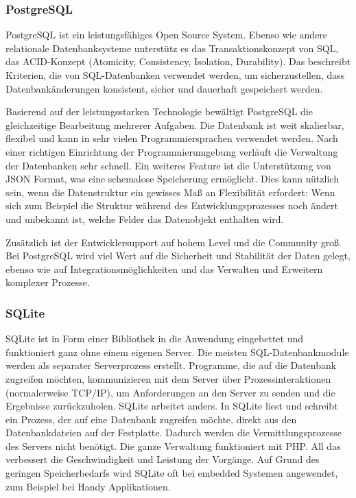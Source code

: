 \subsubsection{PostgreSQL \cite{PostgreSQLAnwendungsfall}}
PostgreSQL ist ein leistungsfähiges Open Source System. Ebenso wie andere relationale Datenbanksysteme unterstütz es das Transaktionskonzept von SQL, das ACID-Konzept (Atomicity, Consistency, Isolation, Durability). Das beschreibt Kriterien, die von SQL-Datenbanken verwendet werden, um sicherzustellen, dass Datenbankänderungen konsistent, sicher und dauerhaft gespeichert werden.

Basierend auf der leistungsstarken Technologie bewältigt PostgreSQL die gleichzeitige Bearbeitung mehrerer Aufgaben. Die Datenbank ist weit skalierbar, flexibel und kann in sehr vielen Programmiersprachen verwendet werden. Nach einer richtigen Einrichtung der Programmierumgebung verläuft die Verwaltung der Datenbanken sehr schnell. Ein weiteres Feature ist die Unterstützung von JSON Format, was eine schemalose Speicherung ermöglicht. Dies kann nützlich sein, wenn die Datenstruktur ein gewisses Maß an Flexibilität erfordert: Wenn sich zum Beispiel die Struktur während des Entwicklungsprozesses noch ändert und unbekannt ist, welche Felder das Datenobjekt enthalten wird. 

Zusätzlich ist der Entwicklersupport auf hohem Level und die Community groß. Bei PostgreSQL wird viel Wert auf die Sicherheit und Stabilität der Daten gelegt, ebenso wie auf Integrationsmöglichkeiten und das Verwalten und Erweitern komplexer Prozesse. 

\subsubsection{SQLite \cite{SQLiteDefinition}}
SQLite ist in Form einer Bibliothek in die Anwendung eingebettet und funktioniert ganz ohne einem eigenen Server. Die meisten SQL-Datenbankmodule werden als separater Serverprozess erstellt. Programme, die auf die Datenbank zugreifen möchten, kommunizieren mit dem Server über Prozessinteraktionen (normalerweise TCP/IP), um Anforderungen an den Server zu senden und die Ergebnisse zurückzuholen. SQLite arbeitet anders. In SQLite liest und schreibt ein Prozess, der auf eine Datenbank zugreifen möchte, direkt aus den Datenbankdateien auf der Festplatte. Dadurch werden die Vermittlungsprozesse des Servers nicht benötigt. Die ganze Verwaltung funktioniert mit PHP. All das verbessert die Geschwindigkeit und Leistung der Vorgänge. Auf Grund des geringen Speicherbedarfs wird SQLite oft bei embedded Systemen angewendet, zum Beispiel bei Handy Applikationen.

